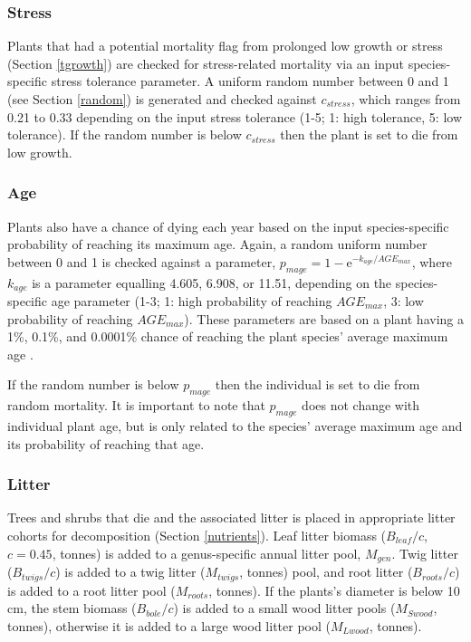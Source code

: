 \documentclass[a4paper, 12pt] {report}
\begin{document}
\subsubsection{Stress}
Plants that had a potential mortality flag from prolonged low growth or stress (Section \ref{tgrowth}) are checked for stress-related mortality via an input species-specific stress tolerance parameter. A uniform random number between 0 and 1 (see Section \ref{random}) is generated and checked against $c_{stress}$, which ranges from 0.21 to 0.33 depending on the input stress tolerance (1-5; 1: high tolerance, 5: low tolerance). If the random number is below $c_{stress}$ then the plant is set to die from low growth.

\subsubsection{Age}
Plants also have a chance of dying each year based on the input species-specific probability of reaching its maximum age. Again, a random uniform number between 0 and 1 is checked against a parameter, $p_{mage} =1 - \text{e}^{-k_{age}/AGE_{max}}$, where $k_{age}$ is a parameter equalling 4.605, 6.908, or 11.51, depending on the species-specific age parameter (1-3; 1: high probability of reaching $AGE_{max}$, 3: low probability of reaching $AGE_{max}$). These parameters are based on a plant having a 1\%, 0.1\%, and 0.0001\% chance of reaching the plant species' average maximum age \cite{shugartModelingForestLandscapes1985, botkinEcologicalConsequencesComputer1972}.

 If the random number is below $p_{mage}$ then the individual is set to die from random mortality. It is important to note that $p_{mage}$ does not change with individual plant age, but is only related to the species' average maximum age and its probability of reaching that age. 

\subsubsection{Litter}
Trees and shrubs that die and the associated litter is placed in appropriate litter cohorts for decomposition (Section \ref{nutrients}). Leaf litter biomass ($B_{leaf}/c$, $c = 0.45$, tonnes) is added to a genus-specific annual litter pool, $M_{gen}$. Twig litter ($B_{twigs}/c$) is added to a twig litter ($M_{twigs}$, tonnes) pool, and root litter ($B_{roots}/c$) is added to a root litter pool ($M_{roots}$, tonnes). If the plants's diameter is below 10 cm, the stem biomass ($B_{bole}/c$) is added to a small wood litter pools ($M_{Swood}$, tonnes), otherwise it is added to a large wood litter pool ($M_{Lwood}$, tonnes). 
\end{document}
